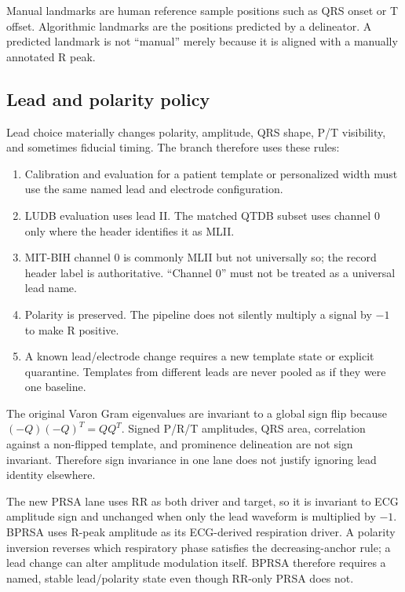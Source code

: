 \documentclass[11pt,a4paper]{article}
\begin{document}
Manual landmarks are human reference sample positions such as QRS onset or T offset. Algorithmic landmarks are the positions predicted by a delineator. A predicted landmark is not ``manual'' merely because it is aligned with a manually annotated R peak.

\subsection{Lead and polarity policy}

Lead choice materially changes polarity, amplitude, QRS shape, P/T visibility, and sometimes fiducial timing. The branch therefore uses these rules:

\begin{enumerate}
  \item Calibration and evaluation for a patient template or personalized width must use the same named lead and electrode configuration.
  \item LUDB evaluation uses lead II. The matched QTDB subset uses channel 0 only where the header identifies it as MLII.
  \item MIT-BIH channel 0 is commonly MLII but not universally so; the record header label is authoritative. ``Channel 0'' must not be treated as a universal lead name.
  \item Polarity is preserved. The pipeline does not silently multiply a signal by $-1$ to make R positive.
  \item A known lead/electrode change requires a new template state or explicit quarantine. Templates from different leads are never pooled as if they were one baseline.
\end{enumerate}

The original Varon Gram eigenvalues are invariant to a global sign flip because $(-Q)(-Q)^T=QQ^T$. Signed P/R/T amplitudes, QRS area, correlation against a non-flipped template, and prominence delineation are not sign invariant. Therefore sign invariance in one lane does not justify ignoring lead identity elsewhere.

The new PRSA lane uses RR as both driver and target, so it is invariant to ECG amplitude sign and unchanged when only the lead waveform is multiplied by $-1$. BPRSA uses R-peak amplitude as its ECG-derived respiration driver. A polarity inversion reverses which respiratory phase satisfies the decreasing-anchor rule; a lead change can alter amplitude modulation itself. BPRSA therefore requires a named, stable lead/polarity state even though RR-only PRSA does not.
\end{document}
